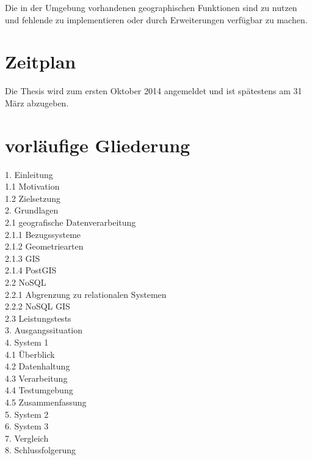 \documentclass[
a4paper,     %
12pt         %
]{scrartcl}  %
\begin{document}
Die in der Umgebung vorhandenen geographischen Funktionen sind zu nutzen und fehlende zu implementieren oder durch Erweiterungen verfügbar zu machen.


\section{Zeitplan}

Die Thesis wird zum ersten Oktober 2014 angemeldet und ist spätestens am 31 März abzugeben.





\section{vorläufige Gliederung}

1. Einleitung\\
1.1 Motivation\\
1.2 Zielsetzung\\
2. Grundlagen\\
2.1 geografische Datenverarbeitung\\
2.1.1 Bezugssysteme\\
2.1.2 Geometriearten\\
2.1.3 GIS\\
2.1.4 PostGIS\\
2.2 NoSQL\\
2.2.1 Abgrenzung zu relationalen Systemen\\
2.2.2 NoSQL GIS\\
2.3 Leistungstests\\
3. Ausgangssituation\\
4. System 1\\
4.1 Überblick\\
4.2 Datenhaltung\\
4.3 Verarbeitung\\
4.4 Testumgebung\\
4.5 Zusammenfassung\\
5. System 2\\
6. System 3\\
7. Vergleich\\
8. Schlussfolgerung\\
\end{document}
